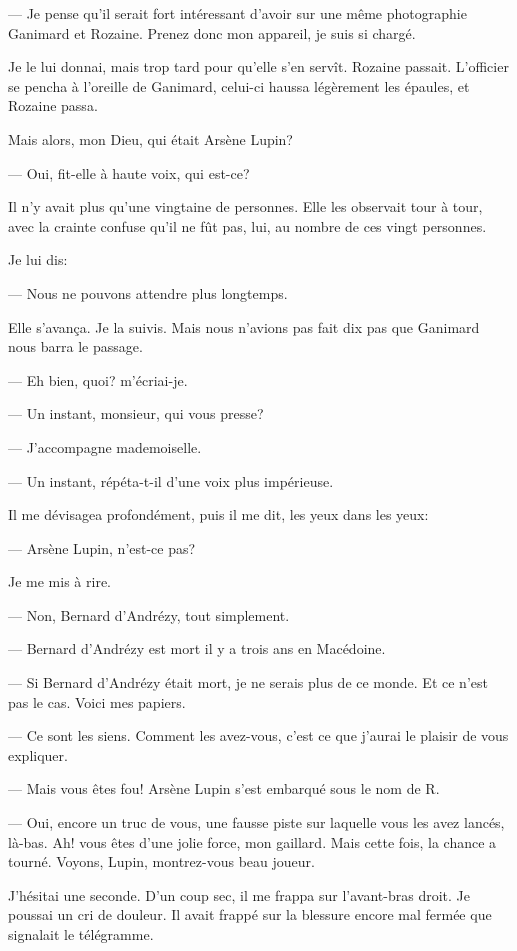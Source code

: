 \documentclass[12pt,a4paper]{article}
\begin{document}
— Je pense qu’il serait fort intéressant d’avoir sur une même photographie Ganimard et Rozaine. Prenez donc mon appareil, je suis si chargé.

Je le lui donnai, mais trop tard pour qu’elle s’en servît. Rozaine passait. L’officier se pencha à l’oreille de Ganimard, celui-ci haussa légèrement les épaules, et Rozaine passa.

Mais alors, mon Dieu, qui était Arsène Lupin?

— Oui, fit-elle à haute voix, qui est-ce? 

Il n’y avait plus qu’une vingtaine de personnes. Elle les observait tour à tour, avec la crainte confuse qu’il ne fût pas, lui, au nombre de ces vingt personnes.

Je lui dis:

— Nous ne pouvons attendre plus longtemps.

Elle s’avança. Je la suivis. Mais nous n’avions pas fait dix pas que Ganimard nous barra le passage.

— Eh bien, quoi? m’écriai-je.

— Un instant, monsieur, qui vous presse?

— J’accompagne mademoiselle.

— Un instant, répéta-t-il d’une voix plus impérieuse.

Il me dévisagea profondément, puis il me dit, les yeux dans les yeux:

— Arsène Lupin, n’est-ce pas?

Je me mis à rire.

— Non, Bernard d’Andrézy, tout simplement.

— Bernard d’Andrézy est mort il y a trois ans en Macédoine.

— Si Bernard d’Andrézy était mort, je ne serais plus de ce monde. Et ce n’est pas le cas. Voici mes papiers.

— Ce sont les siens. Comment les avez-vous, c’est ce que j’aurai le plaisir de vous expliquer.

— Mais vous êtes fou! Arsène Lupin s’est embarqué sous le nom de R. 

— Oui, encore un truc de vous, une fausse piste sur laquelle vous les avez lancés, là-bas. Ah! vous êtes d’une jolie force, mon gaillard. Mais cette fois, la chance a tourné. Voyons, Lupin, montrez-vous beau joueur.

J’hésitai une seconde. D’un coup sec, il me frappa sur l’avant-bras droit. Je poussai un cri de douleur. Il avait frappé sur la blessure encore mal fermée que signalait le télégramme.
\end{document}
